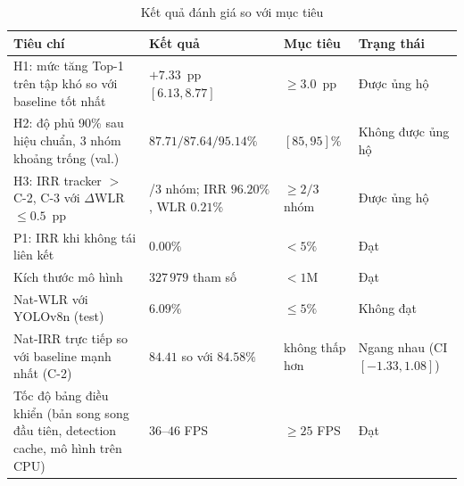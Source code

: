 \begin{table}[H]
    \centering
    \caption{Kết quả đánh giá so với mục tiêu}
    \label{tab:eval_vs_target}
    \footnotesize
    \begin{tabularx}{\textwidth}{>{\raggedright\arraybackslash}p{6.2cm} >{\raggedright\arraybackslash}X l >{\raggedright\arraybackslash}p{2.2cm}}
        \toprule
        \textbf{Tiêu chí} & \textbf{Kết quả} & \textbf{Mục tiêu} & \textbf{Trạng thái} \\
        \midrule
        H1: mức tăng Top-1 trên tập khó so với baseline tốt nhất & $+7.33$~pp $[6.13, 8.77]$ & $\ge 3.0$~pp & Được ủng hộ \\
        H2: độ phủ 90\% sau hiệu chuẩn, 3 nhóm khoảng trống (val.) & $87.71 / 87.64 / 95.14\%$ & $[85, 95]\%$ & Không được ủng hộ \\
        H3: IRR tracker $>$ C-2, C-3 với $\Delta$WLR $\le 0.5$~pp & 3/3 nhóm; IRR $96.20\%$, WLR $0.21\%$ & $\ge 2/3$ nhóm & Được ủng hộ \\
        P1: IRR khi không tái liên kết & $0.00\%$ & $< 5\%$ & Đạt \\
        Kích thước mô hình & $327\,979$ tham số & $< 1$M & Đạt \\
        Nat-WLR với YOLOv8n (test) & $6.09\%$ & $\le 5\%$ & Không đạt \\
        Nat-IRR trực tiếp so với baseline mạnh nhất (C-2) & $84.41$ so với $84.58\%$ & không thấp hơn & Ngang nhau (CI $[-1.33, 1.08]$) \\
        Tốc độ bảng điều khiển (bản song song đầu tiên, detection cache, mô hình trên CPU) & $36$--$46$ FPS & $\ge 25$ FPS & Đạt \\
        \bottomrule
    \end{tabularx}
\end{table}

